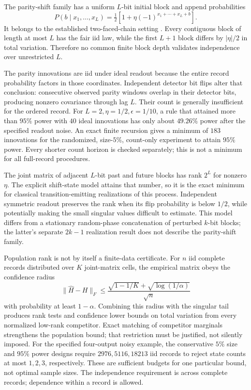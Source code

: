 The parity-shift family has a uniform \(L\)-bit initial block and append
probabilities
\[
 P(b\mid x_1,\ldots,x_L)
 =\tfrac12[1+\eta(-1)^{x_1+\cdots+x_L+b}].
\]
It belongs to the established two-faced-chain setting
\cite{op:ryabko}.  Every contiguous block of length at most \(L\) has the
fair iid law, while the first \(L+1\) block differs by
\(|\eta|/2\) in total variation.  Therefore no common finite block depth
validates independence over unrestricted \(L\).

The parity innovations are iid under ideal readout because the entire
record probability factors in those coordinates.  Independent detector
bit flips alter that conclusion: consecutive observed parity windows
overlap in their detector bits, producing nonzero covariance through lag
\(L\).  Their count is generally insufficient for the ordered record.
For \(L=2,\eta=1/2,\epsilon=1/10\), a rule that attained more than \(95\%\)
power with \(40\) ideal innovations has only about \(49.26\%\) power after
the specified readout noise.  An exact finite recursion gives a minimum
of \(183\) innovations for the randomized, size-\(5\%\), count-only
experiment to attain \(95\%\) power.  Every shorter count horizon is
checked separately; this is not a minimum for all full-record procedures.

The joint matrix of adjacent \(L\)-bit past and future blocks has rank
\(2^L\) for nonzero \(\eta\).  The explicit shift-state model attains that
number, so it is the exact minimum for classical transition-emitting
realizations of this process.  Independent symmetric readout preserves
the rank when its flip probability is below \(1/2\), while potentially
making the small singular values difficult to estimate.
This model differs from a stationary random-phase concatenation of
perturbed \(k\)-bit blocks; the latter's separate \(2k-1\) realization
result does not describe the parity-shift family.

Population rank is not by itself a finite-data certificate.  For \(n\)
iid complete records distributed over \(K\) joint-matrix cells, the
empirical matrix obeys the confidence radius
\[
 \|\widehat H-H\|_F\le
 \frac{\sqrt{1-1/K}+\sqrt{\log(1/\alpha)}}{\sqrt n}
\]
with probability at least \(1-\alpha\).
Combining this radius with the singular tail produces rank tests and
confidence lower bounds on total variation from every normalized
low-rank competitor.  Exact matching of competitor marginals strengthens
the population bound; that restriction must be justified, not silently
imposed.
For the specified four-output noisy example, the conservative \(5\%\)
size and \(95\%\) power designs require \(2976,5116,18213\) iid records
to reject state counts at most \(1,2,3\), respectively.
These are sufficient budgets for one particular bound, not optimal
sample sizes.  The independence requirement is across complete records;
dependence within a record is allowed.

